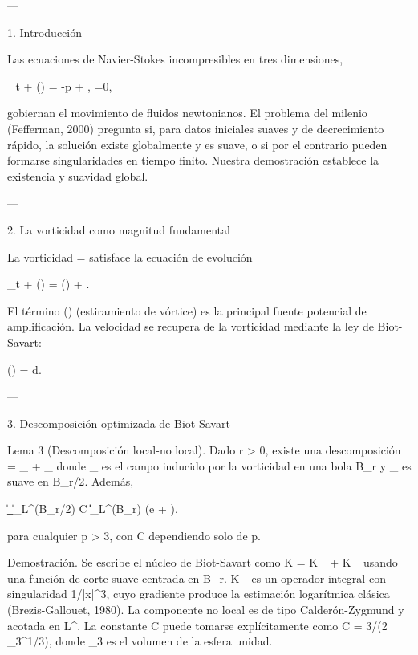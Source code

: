 \documentclass[12pt,twoside]{book}
\begin{document}
---

1. Introducción

Las ecuaciones de Navier-Stokes incompresibles en tres dimensiones,

\partial_t  + (\cdot\nabla) = -\nabla p + \nu \Delta {}, \quad \nabla\cdot{}=0,

gobiernan el movimiento de fluidos newtonianos. El problema del milenio (Fefferman, 2000) pregunta si, para datos iniciales suaves y de decrecimiento rápido, la solución existe globalmente y es suave, o si por el contrario pueden formarse singularidades en tiempo finito. Nuestra demostración establece la existencia y suavidad global.

---

2. La vorticidad como magnitud fundamental

La vorticidad \boldsymbol{\omega} = \nabla\times{} satisface la ecuación de evolución

\partial_t \boldsymbol{\omega} + (\cdot\nabla)\boldsymbol{\omega} = (\boldsymbol{\omega}\cdot\nabla) + \nu \Delta \boldsymbol{\omega}.

El término (\boldsymbol{\omega}\cdot\nabla) (estiramiento de vórtice) es la principal fuente potencial de amplificación. La velocidad se recupera de la vorticidad mediante la ley de Biot-Savart:

() =  \int {} d.

---

3. Descomposición optimizada de Biot-Savart

Lema 3 (Descomposición local-no local). Dado r > 0, existe una descomposición  = _{} + _{} donde _{} es el campo inducido por la vorticidad en una bola B_r y _{} es suave en B_{r/2}. Además,

\|\nabla {}_{}\|_{L^\infty(B_{r/2})} \le C \|\boldsymbol{\omega}\|_{L^\infty(B_r)} \log\left(e + \right),

para cualquier p > 3, con C dependiendo solo de p.

Demostración. Se escribe el núcleo de Biot-Savart como K = K_{} + K_{} usando una función de corte suave \chi centrada en B_r. K_{} es un operador integral con singularidad 1/|x|^3, cuyo gradiente produce la estimación logarítmica clásica (Brezis-Gallouet, 1980). La componente no local es de tipo Calderón-Zygmund y acotada en L^\infty. La constante C puede tomarse explícitamente como C = 3/(2 \omega_3^{1/3}), donde \omega_3 es el volumen de la esfera unidad.
\end{document}
